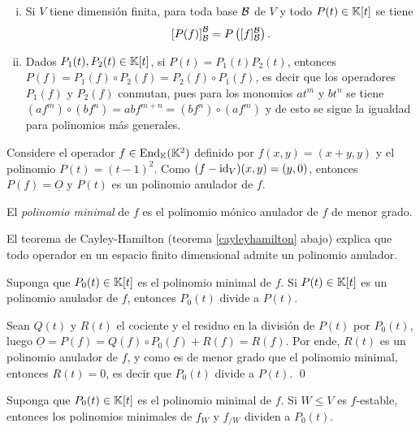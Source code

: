   \begin{obs}\label{observacion_definicion_polinomios_de_operadores}
    \begin{enumerate}[(i)]
      \item Si $V$ tiene dimensión finita, para toda base $\mathcal{B}$ de $V$ y todo $P(t)\in\mathbb{K}[t]$ se tiene
      $$\left[P(f)\right]_{\mathcal{B}}^{\mathcal{B}}=P\left([f]_{\mathcal{B}}^{\mathcal{B}}\right).$$
      \item\label{polinomios_de_operadores_conmutan} Dados $P_1(t),P_2(t)\in \mathbb{K}[t]$, si $P(t)=P_1(t)P_2(t)$, entonces $P(f)=P_1(f)\circ P_2(f)=P_2(f)\circ P_1(f)$, es decir que los operadores $P_1(f)$ y $P_2(f)$ conmutan, pues para los monomios $at^m$ y $bt^n$ se tiene $\left(af^m\right)\circ\left( bf^n\right)=abf^{m+n}=\left( bf^n\right)\circ \left(af^m\right)$ y de esto se sigue la igualdad para polinomios más generales.
    \end{enumerate}
  \end{obs}

  \begin{ejem}
    Considere el operador $f\in\operatorname{End}_{\mathbb{K}}(\mathbb{K}^2)$ definido por $f(x,y)=(x+y,y)$ y el polinomio $P(t)=(t-1)^2$. Como $(f-\operatorname{id}_V)(x,y)=(y,0)$, entonces $P(f)=\underline{O}$ y $P(t)$ es un polinomio anulador de $f$.
  \end{ejem}

  \begin{defn}
    El \emph{polinomio minimal} de $f$ es el polinomio mónico anulador de $f$ de menor grado.
  \end{defn}

  \begin{obs}
    El teorema de Cayley-Hamilton (teorema \ref{cayleyhamilton} abajo) explica que todo operador en un espacio finito dimensional admite un polinomio anulador.
  \end{obs}

  \begin{prop}
    Suponga que $P_0(t)\in\mathbb{K}[t]$ es el polinomio minimal de $f$. Si $P(t)\in\mathbb{K}[t]$ es un polinomio anulador de $f$, entonces $P_0(t)$ divide a $P(t)$.
  \end{prop}

  \dem Sean $Q(t)$ y $R(t)$ el cociente y el residuo en la división de $P(t)$ por $P_0(t)$, luego $\underline{O}=P(f)=Q(f)\circ P_0(f)+R(f)=R(f)$. Por ende, $R(t)$ es un polinomio anulador de $f$, y como es de menor grado que el polinomio minimal, entonces $R(t)=0$, es decir que $P_0(t)$ divide a $P(t)$. \qed

  \begin{prop}\label{polinomio_minimal_estable_y_cociente}
    Suponga que $P_0(t)\in\mathbb{K}[t]$ es el polinomio minimal de $f$. Si $W\le V$ es $f$-estable, entonces los polinomios minimales de $f_W$ y $f_{/W}$ dividen a $P_0(t)$. 
  \end{prop}

